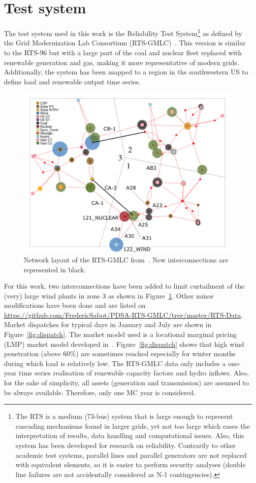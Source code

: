 \section{Test system}
\label{sec:PDSA_test_system}

The test system used in this work is the Reliability Test System\footnote{The RTS is a medium (73-bus) system that is large enough to represent cascading mechanisms found in larger grids, yet not too large which eases the interpretation of results, data handling and computational issues. Also, this system has been developed for research on reliability. Contrarily to other academic test systems, parallel lines and parallel generators are not replaced with equivalent elements, so it is easier to perform security analyses (double line failures are not accidentally considered as N-1 contingencies).} as defined by the Grid Modernization Lab Consortium (RTS-GMLC)~\cite{RTS-GMLC}. This version is similar to the RTS-96 but with a large part of the coal and nuclear fleet replaced with renewable generation and gas, making it more representative of modern grids. Additionally, the system has been mapped to a region in the southwestern US to define load and renewable output time series.

\begin{figure}
    \centering
    \includegraphics[width=0.8\linewidth]{Figs/RTS.png}
    \caption{Network layout of the RTS-GMLC from~\cite{RTS-GMLC}. New interconnections are represented in black.}
    \label{fig:RTS}
\end{figure}

For this work, two interconnections have been added to limit curtailment of the (very) large wind plants in zone 3 as shown in Figure~\ref{fig:RTS}. Other minor modifications have been done and are listed on \url{https://github.com/FredericSabot/PDSA-RTS-GMLC/tree/master/RTS-Data}. Market dispatches for typical days in January and July are shown in Figure~\ref{fig:dispatch}. The market model used is a locational marginal pricing (LMP) market model developed in~\cite{Prescient}. Figure~\ref{fig:dispatch} shows that high wind penetration (above 60\%) are sometimes reached especially for winter months during which load is relatively low. The RTS-GMLC data only includes a one-year time series realisation of renewable capacity factors and hydro inflows. Also, for the sake of simplicity, all assets (generation and transmission) are assumed to be always available. Therefore, only one MC year is considered.

